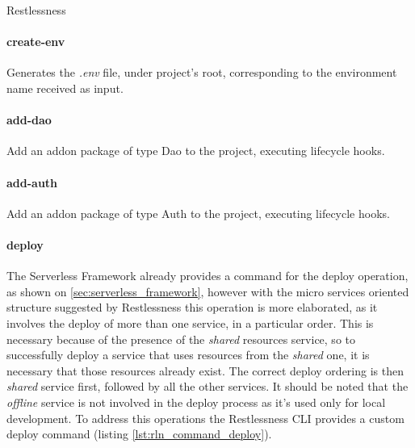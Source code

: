 \begin{chapter}{Restlessness}
    \paragraph{create-env}
    Generates the \textit{.env} file, under project's root, corresponding to the
    environment name received as input.

    \paragraph{add-dao}
    Add an addon package of type Dao to the project, executing lifecycle hooks.

    \paragraph{add-auth}
    Add an addon package of type Auth to the project, executing lifecycle hooks.

    \paragraph{deploy}
    The Serverless Framework already provides a command for the deploy operation,
    as shown on \ref{sec:serverless_framework}, however with the micro services
    oriented structure suggested by Restlessness this operation is more elaborated,
    as it involves the deploy of more than one service, in a particular order.
    This is necessary because of the presence of the \textit{shared} resources
    service, so to successfully deploy a service that uses resources from the
    \textit{shared} one, it is necessary that those resources already exist.
    The correct deploy ordering is then \textit{shared} service first, followed
    by all the other services.
    It should be noted that the \textit{offline} service is not involved in the
    deploy process as it's used only for local development.
    To address this operations the Restlessness CLI provides a custom deploy
    command (listing \ref{lst:rln_command_deploy}).

    \bigskip


\end{chapter}
